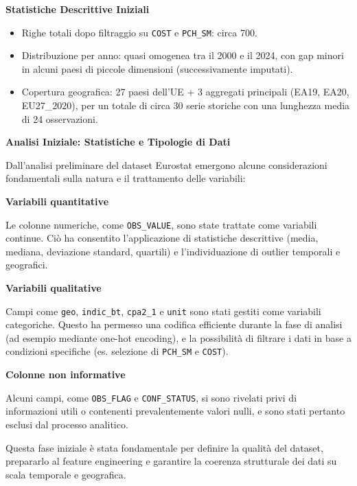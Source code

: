 \documentclass[conference]{IEEEtran}
\begin{document}
\vspace{1em} \noindent\textbf{Statistiche Descrittive Iniziali} \begin{itemize} \item Righe totali dopo filtraggio su \texttt{COST} e \texttt{PCH\_SM}: circa 700. \item Distribuzione per anno: quasi omogenea tra il 2000 e il 2024, con gap minori in alcuni paesi di piccole dimensioni (successivamente imputati). \item Copertura geografica: 27 paesi dell’UE + 3 aggregati principali (EA19, EA20, EU27\_2020), per un totale di circa 30 serie storiche con una lunghezza media di 24 osservazioni. \end{itemize}

\vspace{1em} \noindent\textbf{Analisi Iniziale: Statistiche e Tipologie di Dati} 

Dall’analisi preliminare del dataset Eurostat emergono alcune considerazioni fondamentali sulla natura e il trattamento delle variabili:

\vspace{1em}\noindent\textbf{Variabili quantitative}

Le colonne numeriche, come \texttt{OBS\_VALUE}, sono state trattate come variabili continue. Ciò ha consentito l’applicazione di statistiche descrittive (media, mediana, deviazione standard, quartili) e l’individuazione di outlier temporali e geografici.

\vspace{1em}\noindent\textbf{Variabili qualitative}

Campi come \texttt{geo}, \texttt{indic\_bt}, \texttt{cpa2\_1} e \texttt{unit} sono stati gestiti come variabili categoriche. Questo ha permesso una codifica efficiente durante la fase di analisi (ad esempio mediante one-hot encoding), e la possibilità di filtrare i dati in base a condizioni specifiche (es. selezione di \texttt{PCH\_SM} e \texttt{COST}).

\vspace{1em}\noindent\textbf{Colonne non informative}

Alcuni campi, come \texttt{OBS\_FLAG} e \texttt{CONF\_STATUS}, si sono rivelati privi di informazioni utili o contenenti prevalentemente valori nulli, e sono stati pertanto esclusi dal processo analitico.

\vspace{1em}
Questa fase iniziale è stata fondamentale per definire la qualità del dataset, prepararlo al feature engineering e garantire la coerenza strutturale dei dati su scala temporale e geografica.
\end{document}
